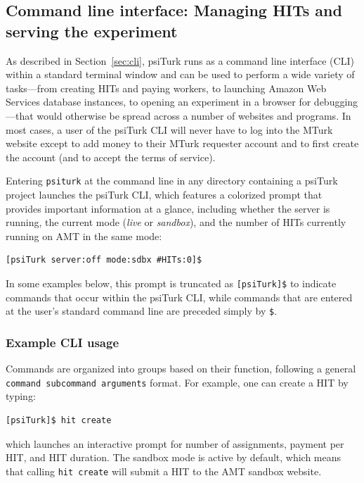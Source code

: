 \documentclass[twocolumn]{svjour3}          %
\newcommand{\psiturk}[0]{\textsf{psiTurk}}
\begin{document}
\subsection{Command line interface: Managing HITs and serving the experiment}

As described in Section~\ref{sec:cli}, \psiturk{} runs as a command line interface
(CLI) within a standard terminal window and can be used to perform a wide
variety of tasks---from creating HITs and paying workers, to launching Amazon
Web Services database instances, to opening an experiment in a browser for
debugging---that would otherwise be spread across a number of websites and
programs. In most cases, a user of the \psiturk{} CLI will never have to log into
the MTurk website except to add money to their MTurk requester account and
to first create the account (and to accept the terms of service).

Entering
\texttt{psiturk} at the command line in any directory containing a \psiturk{} project launches the
\psiturk{} CLI, which features a colorized prompt that provides important information at a glance, including
whether the server is running, the current mode (\emph{live} or \emph{sandbox}), and the number of HITs currently running on AMT in the same mode:

\begin{lstlisting}
[psiTurk server:off mode:sdbx #HITs:0]$
\end{lstlisting}

\noindent In some examples below, this prompt is truncated as \texttt{[psiTurk]\$} to indicate commands that occur within the \psiturk{} CLI, while commands that are entered at the user's standard command line are preceded simply by \texttt{\$}.

\subsubsection{Example CLI usage}
Commands are organized into groups based on their function, following a general \texttt{command subcommand
arguments} format. For example, one can create a HIT by typing: 

\begin{lstlisting}
[psiTurk]$ hit create
\end{lstlisting}

\noindent which launches an interactive prompt for number of assignments, payment per HIT, and HIT duration. The sandbox mode is active by default, which means that calling \texttt{hit create} will submit a HIT to the AMT sandbox website.
\end{document}

